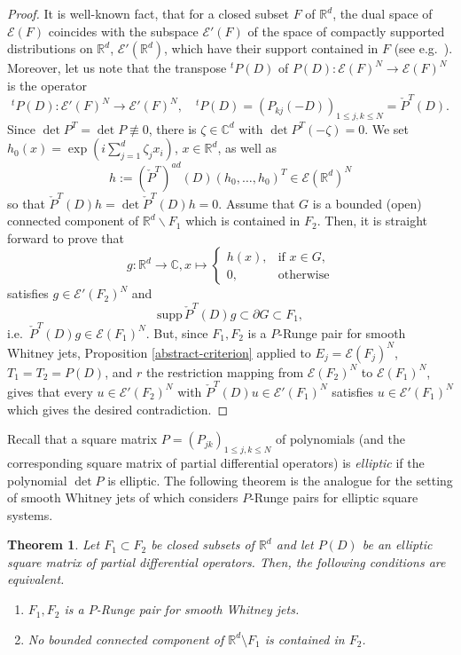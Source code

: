 \documentclass[a4paper,10pt]{amsart}
\newtheorem{theorem}{Theorem}
\newtheorem*{crucial lemma}{Lemma \ref{lem:nice polynomial2}}
\theoremstyle{definition}
\newcommand{\R}{\mathbb{R}}
\newcommand{\C}{\mathbb{C}}
\newcommand{\supp}{\mbox{supp}\,}
\newcommand{\detP}{\operatorname{det}\!P}
\begin{document}
\begin{proof}
    It is  well-known fact, that for a closed subset $F$ of $\R^d$, the dual space of $\mathscr{E}(F)$ coincides with the subspace $\mathscr{E}'(F)$ of the space of compactly supported distributions on $\R^d$, $\mathscr{E}'(\R^d)$, which have their support contained in $F$ (see e.g.~\cite[Proposition 4]{CiasKalmes2025}).
    Moreover, let us note that the transpose ${}^tP(D)$ of $P(D)\colon \mathscr{E}(F)^N\to \mathscr{E}(F)^N$ is the operator
    \[{}^tP(D)\colon \mathscr{E}'(F)^N\to \mathscr{E}'(F)^N,\quad{}^tP(D)=(P_{kj}(-D))_{1\leq j,k\leq N}=\check P^T(D).\]
    Since $\detP^T=\detP\not\equiv 0$, there is $\zeta\in\C^d$ with $\detP^T(-\zeta)=0$. We set $h_0(x)=\exp\left(i\sum_{j=1}^d\zeta_j x_i\right)$, $x\in\R^d$, as well as
    \[h:=\left(\check{P}^T\right)^{ad}(D)(h_0,\ldots,h_0)^T\in\mathscr{E}(\R^d)^N\]
    so that $\check{P}^T(D)h=\det\check{P}^T(D)h=0$.
    Assume that $G$ is a bounded (open) connected component of $\R^d\backslash F_1$ which is contained in $F_2$. Then, it is straight forward to prove that
    \[g:\R^d\rightarrow\C, x\mapsto \begin{cases}
        h(x),&\text{if }x\in G,\\ 0, &\text{otherwise}
    \end{cases}\]
    satisfies $g\in\mathscr{E}'(F_2)^N$ and
    \[\supp\check{P}^T(D)g\subset\partial G\subset F_1,\]
    i.e.~$\check{P}^T(D)g\in\mathscr{E}(F_1)^N$. But, since $F_1, F_2$ is a $P$-Runge pair for smooth Whitney jets, Proposition \ref{abstract-criterion} applied to $E_j=\mathscr{E}(F_j)^N$, $T_1=T_2=P(D)$, and $r$ the restriction mapping from $\mathscr{E}(F_2)^N$ to $\mathscr{E}(F_1)^N$, gives that every $u\in \mathscr{E}'(F_2)^N$ with $\check P^T(D)u\in \mathscr{E}'(F_1)^N$ satisfies $u\in\mathscr{E}'(F_1)^N$ which gives the desired contradiction. 
\end{proof}

Recall that a square matrix $P=(P_{jk})_{1\leq j,k\leq N}$ of polynomials (and the corresponding square matrix of partial differential operators) is \emph{elliptic} if the polynomial ${\det P}$ is elliptic. The following theorem is the analogue for the setting of smooth Whitney jets of \cite[\enquote{Cas d'un syst\'eme pour lequel $p=q$}, p.~337]{Malgrange1955} which considers $P$-Runge pairs for elliptic square systems.

\begin{theorem}\label{th:lax-malgrange for system of pde whitney}
	Let $F_1\subset F_2$ be closed subsets of $\R^d$ and let $P(D)$ be an elliptic square matrix of partial differential operators. Then, the following conditions are equivalent.
\begin{enumerate}[\upshape{(i)}] 
		\item[\upshape{(i)}] $F_1, F_2$ is a $P$-Runge pair for smooth Whitney jets.
		\item[\upshape{(ii)}] No bounded connected component of $\R^d\setminus F_1$ is contained in $F_2$.
	\end{enumerate}
\end{theorem}
\end{document}
